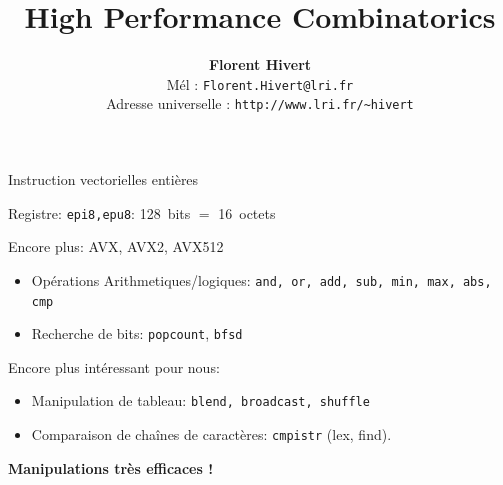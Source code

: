 \documentclass{beamer}
\title[High Performance Combinatorics]%
{\bf High Performance Combinatorics}
\author{\textbf{\Large Florent Hivert}\\[5mm]
  Mél : \texttt{Florent.Hivert@lri.fr}\\
  Adresse universelle : \texttt{http://www.lri.fr/\~{ }hivert}
}
\date{}
\def\opstyle#1{\ensuremath{\operatorname{#1}}}
\begin{document}
\newcommand{\Count}{\opstyle{count}}
\newcommand{\List}{\opstyle{list}}
\newcommand{\Iter}{\opstyle{iter}}
\newcommand{\Unrank}{\opstyle{unrank}}
\newcommand{\Rank}{\opstyle{rank}}
\newcommand{\First}{\opstyle{first}}
\newcommand{\Next}{\opstyle{next}}
\newcommand{\Random}{\opstyle{random}}

\newcommand{\Concat}{\opstyle{concat}}
\newcommand{\BS}{\opstyle{BitString}}
\newcommand{\Perm}{\opstyle{Perm}}
\newcommand{\Union}{\opstyle{Union}}
\newcommand{\Prod}{\opstyle{Prod}}

\newcommand{\Pos}{\opstyle{Pos}}
\newcommand{\Bin}{\opstyle{Bin}}
\newcommand{\Gray}{\opstyle{Gray}}

\newcommand{\mA}{\mathcal{A}}
\newcommand{\mB}{\mathcal{B}}
\newcommand{\mC}{\mathcal{C}}
\newcommand{\mD}{\mathcal{D}}
\newcommand{\mE}{\mathcal{E}}
\newcommand{\mI}{\mathcal{I}}
\newcommand{\mZ}{\mathcal{Z}}

\newcommand{\Oh}{O}

\frame{\titlepage}

\begin{frame}{Instruction vectorielles entières}

  Registre: \texttt{epi8,epu8}: 128~bits $=$ 16~octets
  \bigskip

  Encore plus: AVX, AVX2, AVX512
  \medskip

  \begin{itemize}
  \item Opérations Arithmetiques/logiques: \texttt{and, or, add, sub, min, max, abs, cmp}
  \item Recherche de bits: \texttt{popcount}, \texttt{bfsd}
  \end{itemize}
  \pause
  Encore plus intéressant pour nous:
  \begin{itemize}
  \item Manipulation de tableau: \texttt{blend, broadcast, shuffle}
  \item Comparaison de chaînes de caractères: \texttt{cmpistr} (lex, find).
  \end{itemize}
  \begin{tcolorbox}
    \centering
    \textbf{\large Manipulations très efficaces !}
  \end{tcolorbox}
\end{frame}
\end{document}
